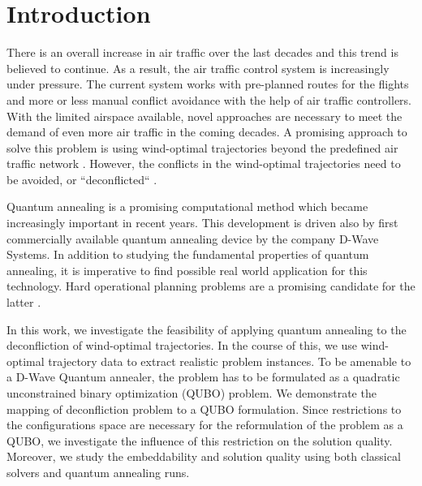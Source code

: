 \section{Introduction}
There is an overall increase in air traffic over the last decades and this trend is believed to continue.
As a result, the air traffic control system is increasingly under pressure.
The current system works with pre-planned routes for the flights and more or less manual conflict avoidance with the help of air traffic controllers.
With the limited airspace available, novel approaches are necessary to meet the demand of even more air traffic in the coming decades.
A promising approach to solve this problem is using wind-optimal trajectories beyond the predefined air traffic network \cite{ng_optimizing_2014}.
However, the conflicts in the wind-optimal trajectories need to be avoided, or ``deconflicted``  \cite{rodionova16}.

Quantum annealing is a promising computational method which became increasingly important in recent years.
This development is driven also by first commercially available quantum annealing device by the company D-Wave Systems.
In addition to studying the fundamental properties of quantum annealing, it is imperative to find possible real world application for this technology.
Hard operational planning problems are a promising candidate for the latter \cite{Rieffel2015, Venturelli2015}.

In this work, we investigate the feasibility of applying quantum annealing to the deconfliction of wind-optimal trajectories. 
In the course of this, we use wind-optimal trajectory data to extract realistic problem instances.
To be amenable to a D-Wave Quantum annealer, the problem has to be formulated as a quadratic unconstrained binary optimization (QUBO) problem.
We demonstrate the mapping of deconfliction problem to a QUBO formulation.
Since restrictions to the configurations space are necessary for the reformulation of the problem as a QUBO, we investigate the influence of this restriction on the solution quality.
Moreover, we study the embeddability and solution quality using both classical solvers and quantum annealing runs.

